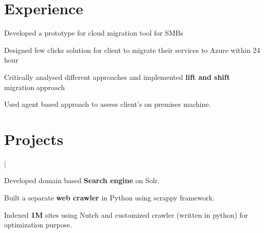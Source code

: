 \documentclass[a4paper]{deedy-resume-openfont}
\begin{document}
\hfill
\begin{minipage}[t]{0.63\textwidth} 

\section{Experience}
\vspace{\topsep}
\begin{tightemize}
\item Developed a prototype for cloud migration tool for SMBs
\item Designed few clicks solution for client to migrate their services to Azure within 24 hour
\item Critically analysed different approaches and implemented \textbf{lift and shift} migration approach
\item Used agent based approach to assess client's on premises machine.
\end{tightemize}

\section{Projects}
 | 
\begin{tightemize}
\item Developed domain based \textbf{Search engine} on Solr.
\item Built a separate \textbf{web crawler} in Python using scrappy framework.
\item Indexed \textbf{1M} sites using Nutch and customized crawler (written in python) for optimization purpose.
\end{tightemize}
\sectionsep



\end{minipage}
\end{document}
